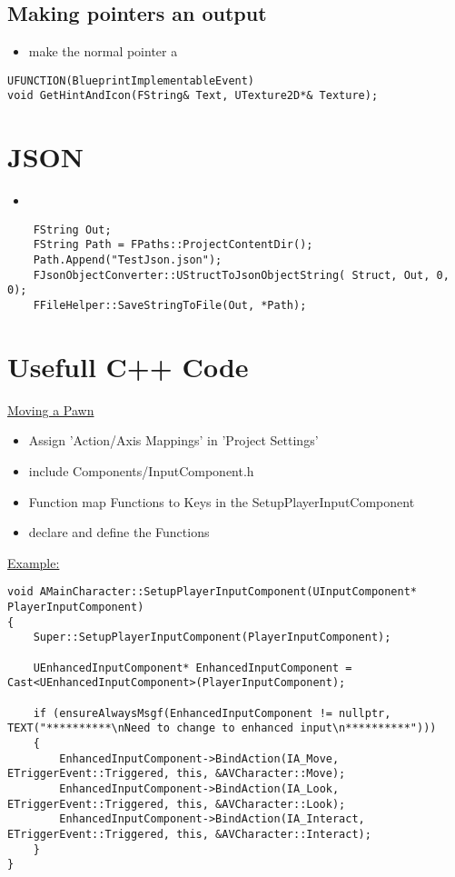         \subsection{Making pointers an output}
        \begin{itemize}
            \item make the normal pointer a 
        \end{itemize}
        \begin{lstlisting}
UFUNCTION(BlueprintImplementableEvent)
void GetHintAndIcon(FString& Text, UTexture2D*& Texture);
        \end{lstlisting}


    \section{JSON}
        \begin{itemize}
            \item 
        \end{itemize}
        \begin{lstlisting}
    FString Out;
	FString Path = FPaths::ProjectContentDir();
	Path.Append("TestJson.json");
	FJsonObjectConverter::UStructToJsonObjectString( Struct, Out, 0, 0);
	FFileHelper::SaveStringToFile(Out, *Path);
        \end{lstlisting}    

    \section{Usefull C++ Code}
        \uline{Moving a Pawn}
            \begin{itemize}
            \item Assign 'Action/Axis Mappings' in 'Project Settings'
                \item include Components/InputComponent.h
                \item Function map Functions to Keys in the SetupPlayerInputComponent 
                \item declare and define the Functions
            \end{itemize}
            \uline{Example:}
\begin{lstlisting}
void AMainCharacter::SetupPlayerInputComponent(UInputComponent* PlayerInputComponent)
{
    Super::SetupPlayerInputComponent(PlayerInputComponent);

    UEnhancedInputComponent* EnhancedInputComponent = Cast<UEnhancedInputComponent>(PlayerInputComponent);

    if (ensureAlwaysMsgf(EnhancedInputComponent != nullptr, TEXT("**********\nNeed to change to enhanced input\n**********")))
    {
        EnhancedInputComponent->BindAction(IA_Move, ETriggerEvent::Triggered, this, &AVCharacter::Move);
        EnhancedInputComponent->BindAction(IA_Look, ETriggerEvent::Triggered, this, &AVCharacter::Look);
        EnhancedInputComponent->BindAction(IA_Interact, ETriggerEvent::Triggered, this, &AVCharacter::Interact);
    }
}           
\end{lstlisting}

